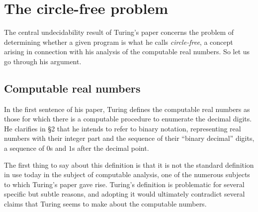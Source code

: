 \documentclass[12pt]{amsart}
\begin{document}
\section{The circle-free problem}

The central undecidability result of Turing's paper concerns the problem of determining whether a given program is what he calls \emph{circle-free}, a concept arising in connection with his analysis of the computable real numbers. So let us go through his argument.

\subsection{Computable real numbers}

In the first sentence of his paper, Turing defines the computable real numbers as those for which there is a computable procedure to enumerate the decimal digits. He clarifies in \S2 that he intends to refer to binary notation, representing real numbers with their integer part and the sequence of their ``binary decimal'' digits, a sequence of $0$s and $1$s after the decimal point.

The first thing to say about this definition is that it is not the standard definition in use today in the subject of computable analysis, one of the numerous subjects to which Turing's paper gave rise. Turing's definition is problematic for several specific but subtle reasons, and adopting it would ultimately contradict several claims that Turing seems to make about the computable numbers.  
\end{document}
